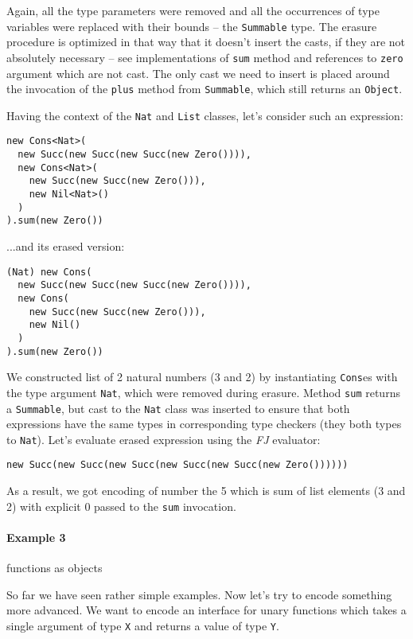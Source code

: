\documentclass{article}[12pt]
\begin{document}
Again, all the type parameters were removed and all the occurrences
of type variables were replaced with their bounds -- the 
\texttt{Summable} type. The erasure procedure is
optimized in that way that it doesn't insert the casts, if they are
not absolutely necessary -- see implementations of \texttt{sum} method
and references to \texttt{zero} argument which are not cast.
The only cast we need to insert is placed around the invocation of 
the \texttt{plus} method from \texttt{Summable}, which still returns
an \texttt{Object}.

Having the context of the \texttt{Nat} and \texttt{List} classes,
let's consider such an expression:

\begin{verbatim}
new Cons<Nat>(
  new Succ(new Succ(new Succ(new Zero()))),
  new Cons<Nat>(
    new Succ(new Succ(new Zero())),
    new Nil<Nat>()
  )
).sum(new Zero())
\end{verbatim}
...and its erased version:
\begin{verbatim}
(Nat) new Cons(
  new Succ(new Succ(new Succ(new Zero()))),
  new Cons(
    new Succ(new Succ(new Zero())),
    new Nil()
  )
).sum(new Zero())
\end{verbatim}

We constructed list of 2 natural numbers
(3 and 2) by instantiating \texttt{Cons}es with the type argument
\texttt{Nat}, which were removed during erasure. Method
\texttt{sum} returns a \texttt{Summable}, but cast to the
\texttt{Nat} class was inserted to ensure that both expressions have
the same types in corresponding type checkers (they both types
to \texttt{Nat}).
Let's evaluate erased expression using the \emph{FJ} evaluator:

\begin{verbatim}
new Succ(new Succ(new Succ(new Succ(new Succ(new Zero())))))
\end{verbatim}

As a result, we got encoding of number the 5 which is sum of list
elements (3 and 2) with explicit 0 passed to the \texttt{sum}
invocation.

\paragraph{Example 3} functions as objects

So far we have seen rather simple examples. Now let's try to
encode something more advanced.
We want to encode an interface for unary functions which takes
a single argument of type \texttt{X} and returns a value
of type \texttt{Y}.
\end{document}
